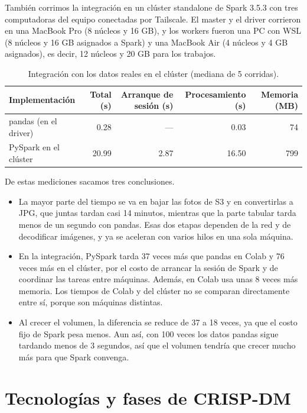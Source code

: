 \documentclass[11pt,letterpaper,DIV=12]{scrartcl}
\begin{document}
También corrimos la integración en un clúster standalone de Spark 3.5.3 con tres computadoras del equipo conectadas por Tailscale. El master y el driver corrieron en una MacBook Pro (8 núcleos y 16 GB), y los workers fueron una PC con WSL (8 núcleos y 16 GB asignados a Spark) y una MacBook Air (4 núcleos y 4 GB asignados), es decir, 12 núcleos y 20 GB para los trabajos.

\begin{table}[H]
  \centering
  \small
  \caption{Integración con los datos reales en el clúster (mediana de 5 corridas).}
  \label{tab:cluster}
  \begin{tabular}{lrrrr}
    \toprule
    Implementación & Total (s) & Arranque de sesión (s) & Procesamiento (s) & Memoria (MB) \\
    \midrule
    pandas (en el driver) & 0.28 & --- & 0.03 & 74 \\
    PySpark en el clúster & 20.99 & 2.87 & 16.50 & 799 \\
    \bottomrule
  \end{tabular}
\end{table}

De estas mediciones sacamos tres conclusiones.

\begin{itemize}
  \item La mayor parte del tiempo se va en bajar las fotos de S3 y en convertirlas a JPG, que juntas tardan casi 14 minutos, mientras que la parte tabular tarda menos de un segundo con pandas. Esas dos etapas dependen de la red y de decodificar imágenes, y ya se aceleran con varios hilos en una sola máquina.
  \item En la integración, PySpark tarda 37 veces más que pandas en Colab y 76 veces más en el clúster, por el costo de arrancar la sesión de Spark y de coordinar las tareas entre máquinas. Además, en Colab usa unas 8 veces más memoria. Los tiempos de Colab y del clúster no se comparan directamente entre sí, porque son máquinas distintas.
  \item Al crecer el volumen, la diferencia se reduce de 37 a 18 veces, ya que el costo fijo de Spark pesa menos. Aun así, con 100 veces los datos pandas sigue tardando menos de 3 segundos, así que el volumen tendría que crecer mucho más para que Spark convenga.
\end{itemize}

\section{Tecnologías y fases de CRISP-DM}\label{sec:tecnologias}
\end{document}
